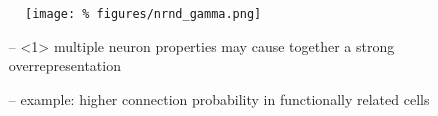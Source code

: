  








  \begin{frame}{}

    \begin{figure}
    \centering
    \texttt{[image: \%
      figures/nrnd\_gamma.png]} %
  \end{figure}

  \vspace{0.2cm}

  \begin{itemize}[leftmargin=1.3cm]
    \large
    \itemsep9pt
  \item[--]<1> multiple neuron properties may cause together a strong overrepresentation
  \item[--] example: higher connection probability in functionally
    related cells \parencite{Lee2016a}

       
  \end{itemize}

  \vspace{0.4cm}
  
  

  
\end{frame}





